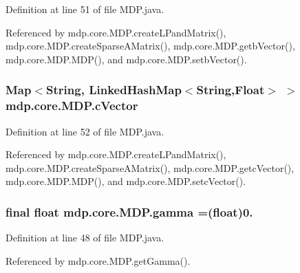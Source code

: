 Definition at line 51 of file M\+D\+P.\+java.



Referenced by mdp.\+core.\+M\+D\+P.\+create\+L\+Pand\+Matrix(), mdp.\+core.\+M\+D\+P.\+create\+Sparse\+A\+Matrix(), mdp.\+core.\+M\+D\+P.\+getb\+Vector(), mdp.\+core.\+M\+D\+P.\+M\+D\+P(), and mdp.\+core.\+M\+D\+P.\+setb\+Vector().

\hypertarget{classmdp_1_1core_1_1_m_d_p_a80af7879a4ff33ac43034eaa934c480f}{}
\subsubsection[{c\+Vector}]{\setlength{\rightskip}{0pt plus 5cm}Map$<$String, Linked\+Hash\+Map$<$String,Float$>$ $>$ mdp.\+core.\+M\+D\+P.\+c\+Vector\hspace{0.3cm}{\ttfamily [private]}}\label{classmdp_1_1core_1_1_m_d_p_a80af7879a4ff33ac43034eaa934c480f}


Definition at line 52 of file M\+D\+P.\+java.



Referenced by mdp.\+core.\+M\+D\+P.\+create\+L\+Pand\+Matrix(), mdp.\+core.\+M\+D\+P.\+create\+Sparse\+A\+Matrix(), mdp.\+core.\+M\+D\+P.\+getc\+Vector(), mdp.\+core.\+M\+D\+P.\+M\+D\+P(), and mdp.\+core.\+M\+D\+P.\+setc\+Vector().

\hypertarget{classmdp_1_1core_1_1_m_d_p_ab240c1d97d39d6f66cff0c8d06a57a69}{}
\subsubsection[{gamma}]{\setlength{\rightskip}{0pt plus 5cm}final float mdp.\+core.\+M\+D\+P.\+gamma =(float)0.\hspace{0.3cm}{\ttfamily [private]}}\label{classmdp_1_1core_1_1_m_d_p_ab240c1d97d39d6f66cff0c8d06a57a69}


Definition at line 48 of file M\+D\+P.\+java.



Referenced by mdp.\+core.\+M\+D\+P.\+get\+Gamma().

\hypertarget{classmdp_1_1core_1_1_m_d_p_ac185a95b0c9eb78b9d5a00b214696191}{}
